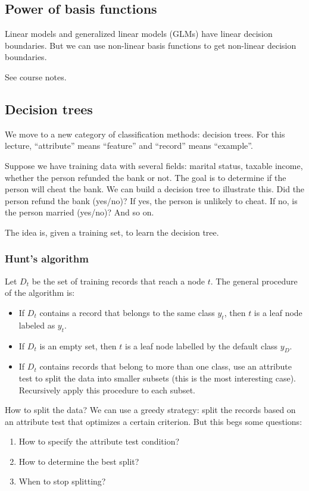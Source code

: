 \documentclass[a4paper,12pt]{article}
\begin{document}
\subsection{Power of basis functions}

Linear models and generalized linear models (GLMs) have linear decision boundaries. But we can use non-linear basis functions to get non-linear decision boundaries. 

See course notes. 


\subsection{Decision trees}

We move to a new category of classification methods: decision trees. For this lecture, ``attribute'' means ``feature'' and ``record'' means ``example''. 

Suppose we have training data with several fields: marital status, taxable income, whether the person refunded the bank or not. The goal is to determine if the person will cheat the bank. We can build a decision tree to illustrate this. Did the person refund the bank (yes/no)? If yes, the person is unlikely to cheat. If no, is the person married (yes/no)? And so on. 

The idea is, given a training set, to learn the decision tree. 

\subsubsection{Hunt's algorithm}

Let $D_t$ be the set of training records that reach a node $t$. The general procedure of the algorithm is: 
\begin{itemize}
\item
If $D_t$ contains a record that belongs to the same class $y_t$, then $t$ is a leaf node labeled as $y_t$. 
\item
If $D_t$ is an empty set, then $t$ is a leaf node labelled by the default class $y_D$. 
\item
If $D_t$ contains records that belong to more than one class, use an attribute test to split the data into smaller subsets (this is the most interesting case). Recursively apply this procedure to each subset. 
\end{itemize}

How to split the data? We can use a greedy strategy: split the records based on an attribute test that optimizes a certain criterion. But this begs some questions: 
\begin{enumerate}
\item
How to specify the attribute test condition? 
\item
How to determine the best split? 
\item
When to stop splitting? 
\end{enumerate}
\end{document}
